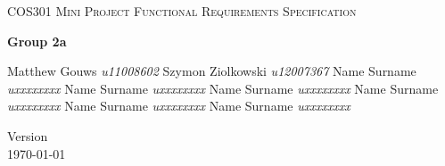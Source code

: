 \begin{titlepage}
\begin{center}

\textsc{\LARGE COS301 Mini Project Functional Requirements Specification}

\textbf{Group 2a} \\
\begin{flushright} \large
Matthew Gouws \emph{u11008602} \newline
Szymon Ziolkowski \emph{u12007367} \newline
Name Surname \emph{uxxxxxxxx} \newline
Name Surname \emph{uxxxxxxxx} \newline
Name Surname \emph{uxxxxxxxx} \newline
Name Surname \emph{uxxxxxxxx} \newline
Name Surname \emph{uxxxxxxxx} \newline
Name Surname \emph{uxxxxxxxx} \newline
\end{flushright}

\vfill

{\large Version }
\\
{\large \today}

\end{center}
\end{titlepage}
